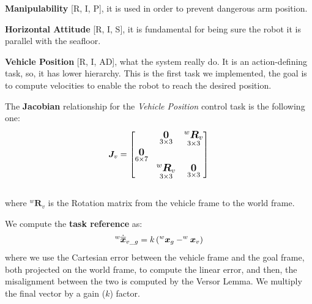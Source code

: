 \documentclass{article}
\begin{document}
\noindent
\begin{description}
	\item \textbf{Manipulability} [R, I, P], it is used in order to prevent dangerous arm position.
	\item \textbf{Horizontal Attitude} [R, I, S], it is fundamental for being sure the robot it is parallel with the seafloor. 
	\item \textbf{Vehicle Position} [R, I, AD], what the system really do. It is an action-defining task, so, it has lower hierarchy. This is the first task we implemented, the goal is to compute velocities to enable the robot to reach the desired position.
\end{description}

\noindent
\vspace{5px}
The \textbf{Jacobian} relationship for the \textit{Vehicle Position} control task is the following one:
\begin{equation}
\large
    \boldsymbol{J}_v = \begin{bmatrix}
 & \underset{3\times3}{\boldsymbol{0}} & \underset{3\times3}{^{w}\boldsymbol{R}_{v}} \\
\underset{6\times7}{\boldsymbol{0}} \\
& \underset{ 3\times 3}{^{w}\boldsymbol{R}_{v}} & \underset{3\times 3}{\boldsymbol{0}} \\
\end{bmatrix}
\end{equation}
\\ 
where ${^{w}\boldsymbol{R}_{v}}$ is the Rotation matrix from the vehicle frame to the world frame.

\noindent
\vspace{5px}
We compute the \textbf{task reference} as:
\begin{equation}
\large
    ^{w}\dot{\overline{\boldsymbol{x}}}_{v\_g}=k\left(^{w} \boldsymbol{x}_{g}-^{w} \boldsymbol{x}_{v}\right)
\end{equation}
where we use the Cartesian error between the vehicle frame and the goal frame, both projected on the world frame, to compute the linear error, and then, the misalignment between the two is computed by the Versor Lemma. We multiply the final vector by a gain ($k$) factor.

\end{document}
